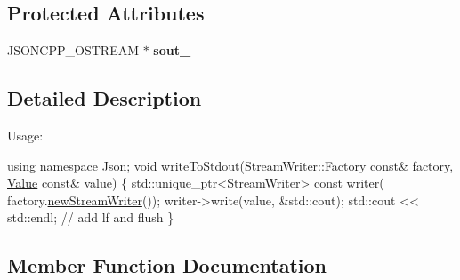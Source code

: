 \subsection*{Protected Attributes}
\begin{DoxyCompactItemize}
\item 
J\+S\+O\+N\+C\+P\+P\+\_\+\+O\+S\+T\+R\+E\+AM $\ast$ {\bfseries sout\+\_\+}\hypertarget{class_json_1_1_stream_writer_a4f5603d4228a9fa46a42cb44e5234d9b}{}\label{class_json_1_1_stream_writer_a4f5603d4228a9fa46a42cb44e5234d9b}

\end{DoxyCompactItemize}


\subsection{Detailed Description}
Usage\+: 
\begin{DoxyCode}
\textcolor{keyword}{using namespace }\hyperlink{namespace_json}{Json};
\textcolor{keywordtype}{void} writeToStdout(\hyperlink{class_json_1_1_stream_writer_1_1_factory}{StreamWriter::Factory} \textcolor{keyword}{const}& factory, 
      \hyperlink{class_json_1_1_value}{Value} \textcolor{keyword}{const}& value) \{
  std::unique\_ptr<StreamWriter> \textcolor{keyword}{const} writer(
    factory.\hyperlink{class_json_1_1_stream_writer_1_1_factory_a9d30ec53e8288cd53befccf1009c5f31}{newStreamWriter}());
  writer->write(value, &std::cout);
  std::cout << std::endl;  \textcolor{comment}{// add lf and flush}
\}
\end{DoxyCode}
 

\subsection{Member Function Documentation}
